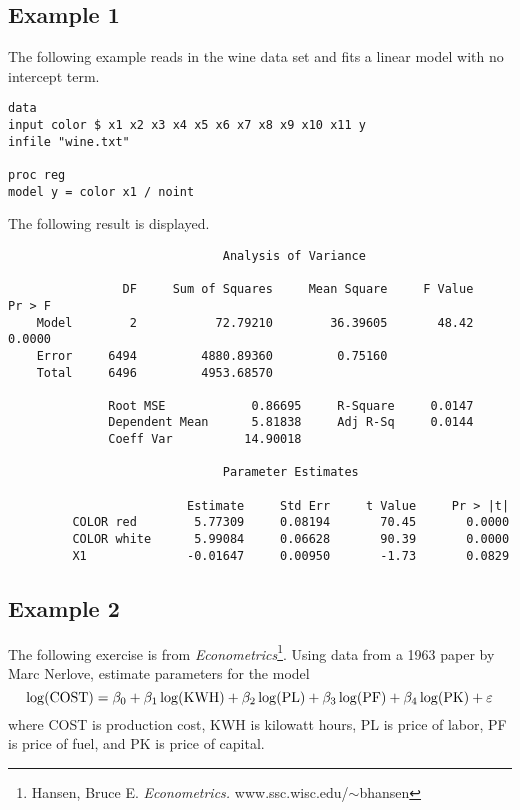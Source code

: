 \documentclass[11pt]{article}
\begin{document}
\subsection*{Example 1}
The following example reads in the wine data set and fits
a linear model with no intercept term.

\begin{Verbatim}
data
input color $ x1 x2 x3 x4 x5 x6 x7 x8 x9 x10 x11 y
infile "wine.txt"

proc reg
model y = color x1 / noint
\end{Verbatim}

The following result is displayed.

\begin{Verbatim}
                              Analysis of Variance

                DF     Sum of Squares     Mean Square     F Value     Pr > F
    Model        2           72.79210        36.39605       48.42     0.0000
    Error     6494         4880.89360         0.75160                       
    Total     6496         4953.68570                                       

              Root MSE            0.86695     R-Square     0.0147
              Dependent Mean      5.81838     Adj R-Sq     0.0144
              Coeff Var          14.90018                        

                              Parameter Estimates

                         Estimate     Std Err     t Value     Pr > |t|
         COLOR red        5.77309     0.08194       70.45       0.0000
         COLOR white      5.99084     0.06628       90.39       0.0000
         X1              -0.01647     0.00950       -1.73       0.0829
\end{Verbatim}

\subsection*{Example 2}
The following exercise is from {\it Econometrics}\footnote{
Hansen, Bruce E. {\it Econometrics.}
www.ssc.wisc.edu/$\sim$bhansen}.
Using data from a 1963 paper by Marc Nerlove,
estimate parameters for the model
\[
\log({\rm COST})=\beta_0+\beta_1\log({\rm KWH})
+\beta_2\log({\rm PL})+\beta_3\log({\rm PF})+\beta_4\log({\rm PK})
+\varepsilon
\]
where COST is production cost,
KWH is kilowatt hours,
PL is price of labor,
PF is price of fuel,
and PK is price of capital.
\end{document}
